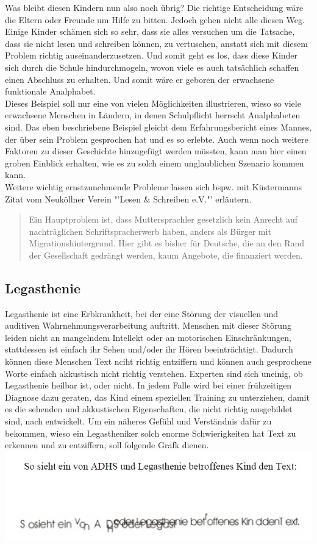 Was bleibt diesen Kindern nun also noch übrig? Die richtige Entscheidung wäre die Eltern oder Freunde um Hilfe zu bitten. Jedoch gehen nicht alle diesen Weg. Einige Kinder schämen sich so sehr, dass sie alles versuchen um die Tatsache, dass sie nicht lesen und schreiben können, zu vertuschen, anstatt sich mit diesem Problem richtig auseinanderzusetzen. Und somit geht es los, dass diese Kinder sich durch die Schule hindurchmogeln, wovon viele es auch tatsächlich schaffen einen Abschluss zu erhalten. Und somit wäre er geboren der erwachsene funktionale Analphabet. \\

Dieses Beispiel soll nur eine von vielen Möglichkeiten illustrieren, wieso so viele erwachsene Menschen in Ländern, in denen Schulpflicht herrscht Analphabeten sind. Das eben beschriebene Beispiel gleicht dem Erfahrungsbericht eines Mannes, der über sein Problem gesprochen hat und es so erlebte. Auch wenn noch weitere Faktoren zu dieser Geschichte hinzugefügt werden müssten, kann man hier einen groben Einblick erhalten, wie es zu solch einem unglaublichen Szenario kommen kann.\\

Weitere wichtig ernstzunehmende Probleme lassen sich bspw. mit Küstermanns Zitat vom Neuköllner Verein "'Lesen \& Schreiben e.V."' erläutern.

\begin{quote}
	Ein Hauptproblem ist, dass Muttersprachler gesetzlich
	kein Anrecht auf nachträglichen Schriftspracherwerb
	haben, anders als Bürger mit Migrationshintergrund. Hier
	gibt es bisher für Deutsche, die an den Rand der
	Gesellschaft gedrängt werden, kaum Angebote, die
	finanziert werden.
\end{quote}


\subsection{Legasthenie}

Legasthenie ist eine Erbkrankheit, bei der eine Störung der visuellen und auditiven Wahrnehmungsverarbeitung auftritt. Menschen mit dieser Störung leiden nicht an mangelndem Intellekt oder an motorischen Einschränkungen, stattdessen ist einfach ihr Sehen und/oder ihr Hören beeinträchtigt. Dadurch können diese Menschen Text nciht richtig entziffern und können auch gesprochene Worte einfach akkustisch nicht richtig verstehen. Experten sind sich uneinig, ob Legasthenie heilbar ist, oder nicht. In jedem Falle wird bei einer frühzeitigen Diagnose dazu geraten, das Kind einem speziellen Training zu unterziehen, damit es die sehenden und akkustischen Eigenschaften, die nicht richtig ausgebildet sind, nach entwickelt. Um ein näheres Gefühl und Verständnis dafür zu bekommen, wieso ein Legastheniker solch enorme Schwierigkeiten hat Text zu erkennen und zu entziffern, soll folgende Grafk dienen.\\

\includegraphics[width=1.00\textwidth]{Daten/legastheneWahrnehmung.jpg}




